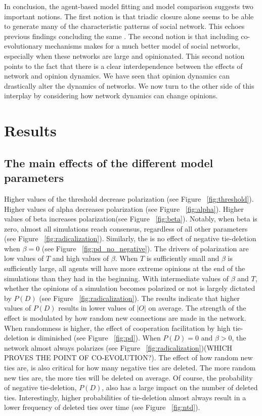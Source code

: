 \documentclass{article}
\begin{document}
In conclusion, the agent-based model fitting and model comparison suggests two important notions. The first notion is that triadic closure alone seems to be able to generate many of the characteristic patterns of social network. This echoes previous findings concluding the same \cite{ilany_social_2016,jackson_meeting_2007, jackson_search_2004}. The second notion is that including co-evolutionary mechanisms makes for a much better model of social networks, especially when these networks are large and opinionated. 
This second notion points to the fact that there is a clear interdependence between the effects of network and opinion dynamics. We have seen that opinion dynamics can drastically alter the dynamics of networks. We now turn to the other side of this interplay by considering how network dynamics can change opinions.

\section{Results}

\subsection{The main effects of the different model parameters}

Higher values of the threshold decrease polarization (see Figure ~\ref{fig:threshold}). Higher values of alpha decreases polarization (see Figure ~\ref{fig:alpha}). Higher values of beta increases polarization(see Figure ~\ref{fig:beta}). Notably, when beta is zero, almost all simulations reach consensus, regardless of all other parameters (see Figure ~\ref{fig:radicalization}). Similarly, the is no effect of negative tie-deletion when $\beta = 0$ (see Figure ~\ref{fig:pd_no_negative}). 
The drivers of polarization are low values of $T$ and high values of $\beta$. When $T$ is sufficiently small and $\beta$ is sufficiently large, all agents will have more extreme opinions at the end of the simulations than they had in the beginning. With intermediate values of $\beta$ and $T$, whether the opinions of a simulation becomes polarized or not is largely dictated by $P(D)$ (see Figure ~\ref{fig:radicalization}). 
The results indicate that higher values of $P(D)$ results in lower values of $|O|$ on average. 
The strength of the effect is modulated by how random new connections are made in the network. 
When randomness is higher, the effect of cooperation facilitation by high tie-deletion is diminished (see Figure ~\ref{fig:pd}). 
When $P(D) = 0$ and $\beta > 0$, the network almost always polarizes (see Figure ~\ref{fig:radicalization})(WHICH PROVES THE POINT OF CO-EVOLUTION?).
The effect of how random new ties are, is also critical for how many negative ties are deleted. 
The more random new ties are, the more ties will be deleted on average. Of course, the probability of negative tie-deletion, $P(D)$, also has a large impact on the number of deleted ties. 
Interestingly, higher probabilities of tie-deletion almost always result in a lower frequency of deleted ties over time (see Figure ~\ref{fig:ntd}).
\end{document}
